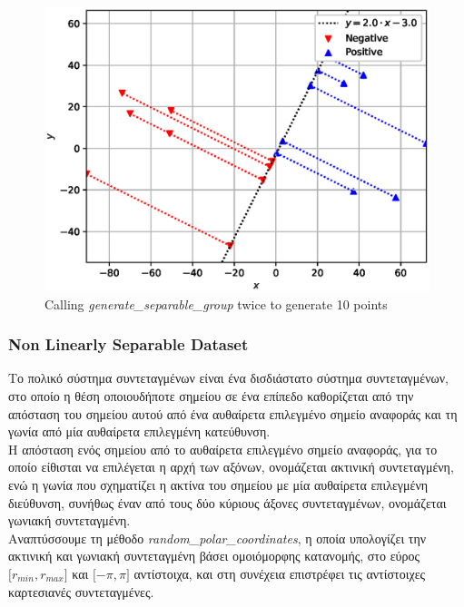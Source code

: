 \documentclass[12pt]{article}
\newenvironment{matlab}
	{\begin{figure}[H]\centering\captionsetup{justification=centering}}
	{\end{figure}}
\begin{document}
\begin{matlab}
    \includegraphics[scale=0.75]{figures/perpendicular}
    \caption{Calling \textit{generate\_separable\_group} twice to generate 10 points }
\end{matlab}

\subsubsection{Non Linearly Separable Dataset}

Tο πολικό σύστημα συντεταγμένων είναι ένα δισδιάστατο σύστημα συντεταγμένων,
στο οποίο η θέση οποιουδήποτε σημείου σε ένα επίπεδο καθορίζεται από την απόσταση του σημείου αυτού
από ένα αυθαίρετα επιλεγμένο σημείο αναφοράς και τη γωνία από μία αυθαίρετα επιλεγμένη κατεύθυνση. \\

Η απόσταση ενός σημείου από το αυθαίρετα επιλεγμένο σημείο αναφοράς,
για το οποίο είθισται να επιλέγεται η αρχή των αξόνων,
ονομάζεται ακτινική συντεταγμένη, ενώ η γωνία που σχηματίζει η ακτίνα του σημείου
με μία αυθαίρετα επιλεγμένη διεύθυνση, συνήθως έναν από τους δύο κύριους άξονες συντεταγμένων,
ονομάζεται γωνιακή συντεταγμένη. \\

Αναπτύσσουμε τη μέθοδο \textit{random\_polar\_coordinates},
η οποία υπολογίζει την ακτινική και γωνιακή συντεταγμένη βάσει ομοιόμορφης κατανομής,
στο εύρος \( \lbrack r_{min}, r_{max} \rbrack \) και \( \lbrack -\pi, \pi \rbrack \)
αντίστοιχα, και στη συνέχεια επιστρέφει τις αντίστοιχες καρτεσιανές συντεταγμένες. \\
\end{document}
